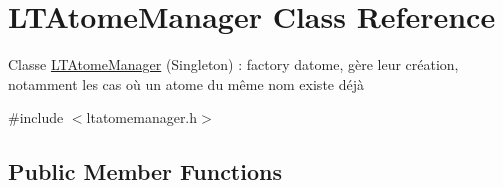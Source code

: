 \hypertarget{class_l_t_atome_manager}{}\section{L\+T\+Atome\+Manager Class Reference}
\label{class_l_t_atome_manager}


Classe \hyperlink{class_l_t_atome_manager}{L\+T\+Atome\+Manager} (Singleton) \+: factory d\textquotesingle{}atome, gère leur création, notamment les cas où un atome du même nom existe déjà  




{\ttfamily \#include $<$ltatomemanager.\+h$>$}

\subsection*{Public Member Functions}
